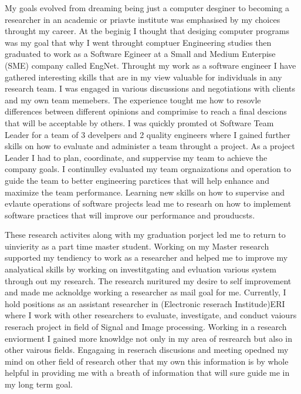 \documentclass[a4paper,12pt]{article}%
\begin{document}
 
 My goals evolved from dreaming being just a computer desginer to becoming a researcher in an academic or priavte institute was emphasised by my choices throught my career. At the beginig I thought that desiging computer programs was my goal that why I went throught comptuer Engineering studies then graduated to work as a Software Egineer at a Small and Medium Enterpise (SME) company called EngNet. Throught my work as a software engineer I have gathered interesting skills that are in my view valuable for individuals in any research team.  I was engaged in various discussions and negotiations with clients and my own team memebers. The experience tought me how to resovle differences between different opinions and comprimise to reach a final descions that will be acceptable by others. I was quickly promted ot Software Team Leader for a team of 3 develpers and 2 quality engineers  where I gained further skills on how to  evaluate and administer a team throught a project. As a project Leader I had to plan, coordinate, and  suppervise my team to achieve the company goals. I continulley evaluated my team orgnaizations and operation to guide the team to better engineering parctices that will help enhance and maximize the team performance.  Learning new skills on how to supervise and evlaute operations of software projects lead me to researh on how to implement software practices that will improve our performance and prouducsts.  
 
 These research activites along with my graduation porject led me to return to uinvierity as a part time master student.  Working on my Master research supported my tendiency to work as a researcher and helped me to improve my analyatical skills by working on investitgating and evluation various system through out my research. The research nuritured my desire to self improvement and made me acknoldge working a researcher as mail goal for me. Currently, I hold positions as an assistant researcher in (Electronic reserach Institude)ERI where I work with other researchers to evaluate, investigate, and conduct  vaiours reserach project in field of Signal and Image processing. Working in a research enviorment I gained more knowldge not only in my area of resrearch but also in other vairous fields. Engagaing in reserach discusions and meeting opedned my mind  on other field of research other that my own this information is by whole helpful in providing me with  a breath of information that will sure guide me in my long term goal.  
 
 
\end{document}
